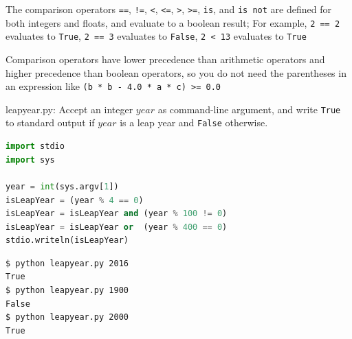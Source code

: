 \documentclass[8pt,a4paper,compress]{beamer}
\begin{document}
\begin{frame}[fragile]
\pause

The comparison operators \lstinline{==}, \lstinline{!=}, \lstinline{<}, \lstinline{<=}, \lstinline{>}, \lstinline{>=}, \lstinline{is}, and \lstinline{is not} are defined for both integers and floats, and evaluate to a boolean result; For example, \lstinline{2 == 2} evaluates to \lstinline{True}, \lstinline{2 == 3} evaluates to \lstinline{False}, \lstinline{2 < 13} evaluates to \lstinline{True} 

\pause
\bigskip

Comparison operators have lower precedence than arithmetic operators and higher precedence than boolean operators, so you do not need the parentheses in an expression like \lstinline{(b * b - 4.0 * a * c) >= 0.0}
\end{frame}

\begin{frame}[fragile]
\pause

\begin{framed}
\tiny leapyear.py: Accept an integer $year$ as command-line argument, and write \lstinline{True} to standard output if $year$ is a leap year and \lstinline{False} otherwise. 
\end{framed}

\begin{lstlisting}[language=Python]
import stdio
import sys

year = int(sys.argv[1])
isLeapYear = (year % 4 == 0)
isLeapYear = isLeapYear and (year % 100 != 0)
isLeapYear = isLeapYear or  (year % 400 == 0)
stdio.writeln(isLeapYear)
\end{lstlisting}

\pause

\begin{lstlisting}[language={}]
$ python leapyear.py 2016
True
$ python leapyear.py 1900
False
$ python leapyear.py 2000
True
\end{lstlisting}
\end{frame}
\end{document}
